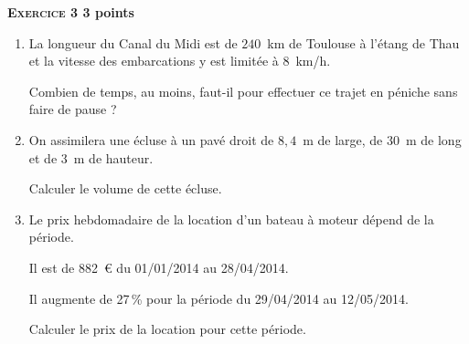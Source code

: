\textbf{\textsc{Exercice 3} \hfill 3 points}

\medskip
 
\begin{enumerate}
\item La longueur du Canal du Midi est de $240$~km de Toulouse à l'étang de Thau et la vitesse des embarcations y est limitée à $8$~km/h. 

Combien de temps, au moins, faut-il pour effectuer ce trajet en péniche sans faire de pause ? 
\item On assimilera une écluse à un pavé droit de $8,4$~m de large, de $30$~m de long et de $3$~m de hauteur. 

Calculer le volume de cette écluse. 
\item Le prix hebdomadaire de la location d'un bateau à moteur dépend de la période.
 
Il est de 882~\euro{} du 01/01/2014 au 28/04/2014.
 
Il augmente de 27\,\% pour la période du 29/04/2014 au 12/05/2014.
 
Calculer le prix de la location pour cette période.
\end{enumerate}
 
\vspace{0,5cm}

